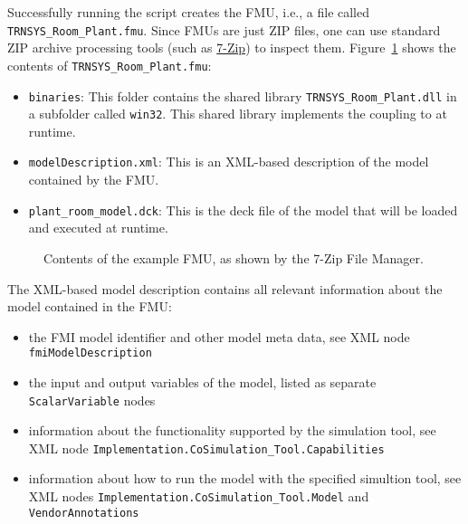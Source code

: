 Successfully running the script creates the FMU, i.e., a file called \verb!TRNSYS_Room_Plant.fmu!.
Since FMUs are just ZIP files, one can use standard ZIP archive processing tools (such as \href{http://www.7-zip.org/}{7-Zip}) to inspect them.
Figure~\ref{fig:inspect_fmu} shows the contents of \verb!TRNSYS_Room_Plant.fmu!:
\begin{itemize}
  \item \verb!binaries!: This folder contains the shared library \verb!TRNSYS_Room_Plant.dll! in a subfolder called \verb!win32!.
  This shared library implements the coupling to \trnsys at runtime.
  \item \verb!modelDescription.xml!: This is an XML-based description of the model contained by the FMU.
  \item \verb!plant_room_model.dck!: This is the deck file of the model that will be loaded and executed at runtime.
\end{itemize}

\begin{figure}[h!]
\vspace*{1em}
\caption{Contents of the example FMU, as shown by the 7-Zip File Manager.}
\label{fig:inspect_fmu}
\end{figure}

The XML-based model description contains all relevant information about the model contained in the FMU:
\begin{itemize}
  \item the FMI model identifier and other model meta data, see XML node \texttt{fmiModelDescription}

  \item the input and output variables of the model, listed as separate \texttt{ScalarVariable} nodes

  \item information about the functionality supported by the simulation tool, see XML node \verb!Implementation.CoSimulation_Tool.Capabilities!
  
  \item information about how to run the model with the specified simultion tool, see XML nodes \verb!Implementation.CoSimulation_Tool.Model! and \verb!VendorAnnotations!
\end{itemize}

